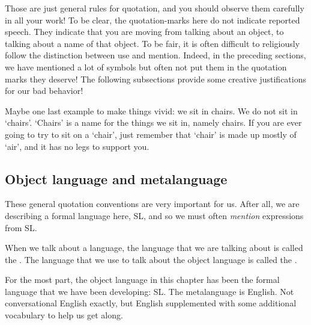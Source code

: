 Those are just general rules for quotation, and you should observe them carefully in all your work! To be clear, the quotation-marks here do not indicate reported speech. They indicate that you are moving from talking about an object, to talking about a name of that object. {\color{black} To be fair, it is often difficult to religiously follow the distinction between use and mention. Indeed, in the preceding sections, we have mentioned a lot of symbols but often not put them in the quotation marks they deserve! The following subsections provide some creative justifications for our bad behavior!}

{\color{black} Maybe one last example to make things vivid: we sit in chairs. We do not sit in `chairs'. `Chairs' is a name for the things we sit in, namely chairs. If you are ever going to try to sit on a `chair', just remember that `chair' is made up mostly of `air', and it has no legs to support you.}


\subsection{Object language and metalanguage}
These general quotation conventions are very important for us. After all, we are describing a formal language here, SL, and so we must often \emph{mention} expressions from SL.

When we talk about a language, the language that we are talking about is called the . The language that we use to talk about the object language is called the .

\iffalse  %
\label{def.metalanguage}
\newglossaryentry{object language}
{
name=object language,
description={A language that is constructed and studied by logicians. In this textbook,
 the object languages are SL and QL}
}

\newglossaryentry{metalanguage}
{
name=metalanguage,
description={The language logicians use to talk about the object language. In this textbook, the metalanguage is English, supplemented by certain symbols like metavariables and technical terms like ``valid''}
}
\fi 

For the most part, the object language in this chapter has been the formal language that we have been developing: SL. The metalanguage is English. Not conversational English exactly, but English supplemented with some additional vocabulary to help us get along.

